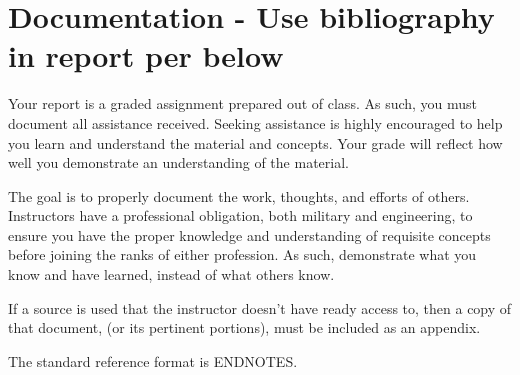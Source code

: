 \section{Documentation - Use bibliography in report per below}
Your report is a graded assignment prepared out of class.  As such, you must document all assistance received.  Seeking assistance is highly encouraged to help you learn and understand the material and concepts.  Your grade will reflect how well you demonstrate an understanding of the material.

The goal is to properly document the work, thoughts, and efforts of others.  Instructors have a professional obligation, both military and engineering, to ensure you have the proper knowledge and understanding of requisite concepts before joining the ranks of either profession.  As such, demonstrate what you know and have learned, instead of what others know.

If a source is used that the instructor doesn't have ready access to, then a copy of that document, (or its pertinent portions), must be included as an appendix.

The standard reference format is ENDNOTES.